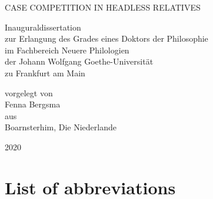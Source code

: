 \documentclass[11pt,hidelinks]{memoir}
\begin{document}

\frontmatter

\begin{titlingpage}

\center
\Large

CASE COMPETITION IN HEADLESS RELATIVES\\

\vspace{4em}

Inauguraldissertation\\
\vspace{1em}
zur Erlangung des Grades eines Doktors der Philosophie\\
\vspace{1em}
im Fachbereich Neuere Philologien\\
\vspace{1em}
der Johann Wolfgang Goethe-Universität\\
\vspace{1em}
zu Frankfurt am Main\\

\vspace{5em}

vorgelegt von\\
\vspace{1em}
Fenna Bergsma\\
\vspace{1em}
aus\\
\vspace{1em}
Boarnsterhim, Die Niederlande\\

\vspace{3em}

2020

\end{titlingpage}

\clearpage
\tableofcontents

\clearpage
\listoftables

\clearpage
\listoffigures

\chapter*[List of abbreviations]{List of abbreviations}
\begingroup
  \setlength{\LTleft}{-\tabcolsep}
\printacronyms[include=abbr, heading=none]
\endgroup
{}


\mainmatter
\setcounter{secnumdepth}{4}


\end{document}
